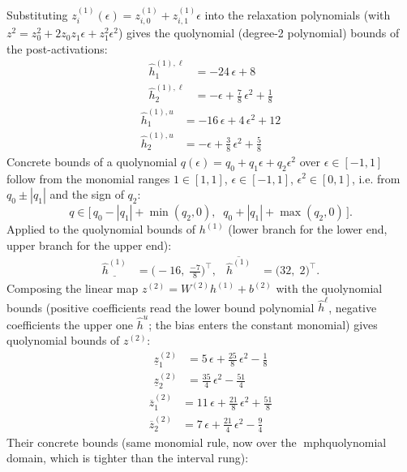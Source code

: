 \documentclass[11pt]{article}
\begin{document}
Substituting $z^{(1)}_i(\epsilon) = z^{(1)}_{i,0} + z^{(1)}_{i,1} \epsilon$ into the relaxation
polynomials (with $z^2 = z_0^2 + 2 z_0 z_1 \epsilon + z_1^2 \epsilon^2$) gives the quolynomial
(degree-2 polynomial) bounds of the post-activations:
\begin{align*}
\hat{h}^{(1),\ell}_{1} &= -24\,\epsilon + 8 \\
\hat{h}^{(1),\ell}_{2} &= -\epsilon + \frac{7}{8}\,\epsilon^2 + \frac{1}{8}
\end{align*}
\begin{align*}
\hat{h}^{(1),u}_{1} &= -16\,\epsilon + 4\,\epsilon^2 + 12 \\
\hat{h}^{(1),u}_{2} &= -\epsilon + \frac{3}{8}\,\epsilon^2 + \frac{5}{8}
\end{align*}
Concrete bounds of a quolynomial $q(\epsilon) = q_0 + q_1 \epsilon + q_2 \epsilon^2$ over
$\epsilon \in [-1, 1]$ follow from the monomial ranges $1 \in [1, 1]$, $\epsilon \in [-1, 1]$,
$\epsilon^2 \in [0, 1]$, i.e. from $q_0 \pm |q_1|$ and the sign of $q_2$:
\begin{equation*}
q \in \bigl[\, q_0 - |q_1| + \min(q_2, 0), \;\; q_0 + |q_1| + \max(q_2, 0) \,\bigr].
\end{equation*}
Applied to the quolynomial bounds of $h^{(1)}$ (lower branch for the lower end, upper branch for the upper end):
\begin{align*}
\underline{\hat{h}^{(1)}} &= \bigl(-16,\; \frac{-7}{8}\bigr)^{\!\top}, & \overline{\hat{h}^{(1)}} &= \bigl(32,\; 2\bigr)^{\!\top}.
\end{align*}
Composing the linear map $z^{(2)} = W^{(2)} h^{(1)} + b^{(2)}$ with the quolynomial bounds
(positive coefficients read the lower bound polynomial $\hat{h}^{\ell}$, negative coefficients the
upper one $\hat{h}^{u}$; the bias enters the constant monomial) gives quolynomial bounds of
$z^{(2)}$:
\begin{align*}
\underline{z}^{(2)}_{1} &= 5\,\epsilon + \frac{25}{8}\,\epsilon^2 - \frac{1}{8} \\
\underline{z}^{(2)}_{2} &= \frac{35}{4}\,\epsilon^2 - \frac{51}{4}
\end{align*}
\begin{align*}
\overline{z}^{(2)}_{1} &= 11\,\epsilon + \frac{21}{8}\,\epsilon^2 + \frac{51}{8} \\
\overline{z}^{(2)}_{2} &= 7\,\epsilon + \frac{21}{4}\,\epsilon^2 - \frac{9}{4}
\end{align*}
Their concrete bounds (same monomial rule, now over the mph{quolynomial} domain, which is tighter than the interval rung):
\end{document}
